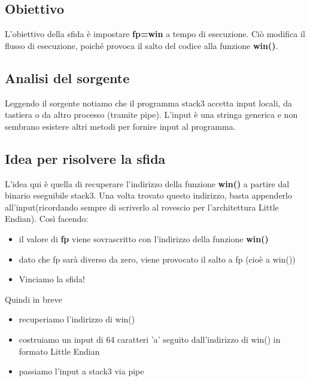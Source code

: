 \subsection{Obiettivo}
L'obiettivo della sfida è impostare \textbf{fp=win} a tempo di esecuzione. Ciò modifica il flusso di esecuzione, poiché provoca il salto del codice alla funzione \textbf{win()}.

\subsection{Analisi del sorgente}
Leggendo il sorgente notiamo che il programma stack3 accetta input locali, da tastiera o da altro processo (tramite pipe). L'input è una stringa generica e non sembrano esistere altri metodi per fornire input al programma.

\subsection{Idea per risolvere la sfida}
L'idea qui è quella di recuperare l'indirizzo della funzione \textbf{win()} a partire dal binario eseguibile stack3.
Una volta trovato questo indirizzo, basta appenderlo all'input(ricordando sempre di scriverlo al rovescio per l'architettura Little Endian). Così facendo:
\begin{itemize}
    \item il valore di \textbf{fp} viene sovrascritto con l'indirizzo della funzione \textbf{win()}
    \item dato che fp sarà diverso da zero, viene provocato il salto a fp (cioè a win()) 
    \item Vinciamo la sfida!
\end{itemize}
Quindi in breve
\begin{itemize}
    \item recuperiamo l'indirizzo di win()
    \item costruiamo un input di 64 caratteri 'a' seguito dall'indirizzo di win() in formato Little Endian
    \item passiamo l'input a stack3 via pipe
\end{itemize}


